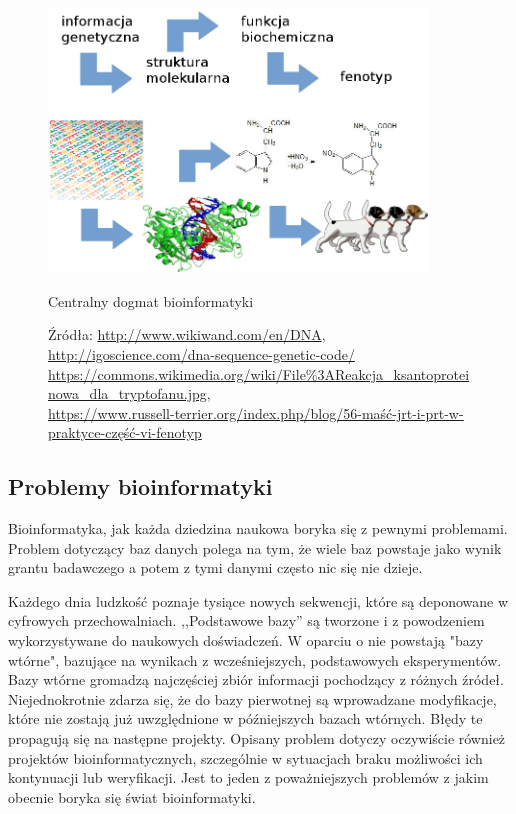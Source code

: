 \begin{figure}[h]
	\centering
	\includegraphics[width=0.9\textwidth]{img/centralny-dogmat.png}
	\caption{Centralny dogmat bioinformatyki}
	\vspace{-0.5cm}
	\caption*{\scriptsize Źródła: 
		\url{http://www.wikiwand.com/en/DNA},
		\url{http://igoscience.com/dna-sequence-genetic-code/} \\
		\url{https://commons.wikimedia.org/wiki/File\%3AReakcja\_ksantoproteinowa\_dla\_tryptofanu.jpg}, \\
		\url{https://www.russell-terrier.org/index.php/blog/56-maść-jrt-i-prt-w-praktyce-część-vi-fenotyp}
	}
	\label{img:centralny-dogmat}
\end{figure}

\subsection*{Problemy bioinformatyki}
Bioinformatyka, jak każda dziedzina naukowa boryka się z pewnymi problemami. 
Problem dotyczący baz danych polega na tym, że wiele baz powstaje jako wynik grantu badawczego a potem z tymi danymi często nic się nie dzieje.

Każdego dnia ludzkość poznaje tysiące nowych sekwencji, które są deponowane w cyfrowych przechowalniach. 
,,Podstawowe bazy'' są tworzone i z powodzeniem wykorzystywane do naukowych doświadczeń. W oparciu o nie powstają "bazy wtórne", bazujące na wynikach z wcześniejszych, podstawowych eksperymentów. 
Bazy wtórne gromadzą najczęściej zbiór informacji pochodzący z różnych źródeł.
Niejednokrotnie zdarza się, że do bazy pierwotnej są wprowadzane modyfikacje, które nie zostają już uwzględnione w późniejszych bazach wtórnych. 
Błędy te propagują się na następne projekty. 
Opisany problem dotyczy oczywiście również projektów bioinformatycznych, szczególnie w sytuacjach braku możliwości ich kontynuacji lub weryfikacji.
Jest to jeden z poważniejszych problemów z jakim obecnie boryka się świat bioinformatyki.


